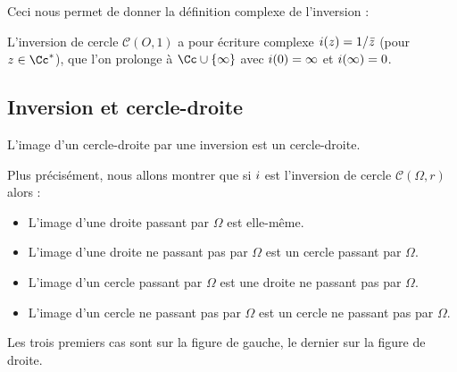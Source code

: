 \documentclass[11pt,class=report,crop=false]{standalone}
\begin{document}
Ceci nous permet de donner la définition complexe de l'inversion :

\begin{exemple}
L'inversion de cercle $\mathcal{C}(O,1)$ a pour écriture complexe $i(z)=1/ \bar z$ (pour $z\in \Cc^*$),
que l'on prolonge à $\Cc \cup \{\infty\}$ avec $i(0) = \infty$ et $i(\infty)=0$.
\end{exemple}


\subsection{Inversion et cercle-droite}

\begin{theoreme}
L'image d'un cercle-droite par une inversion est un cercle-droite. 
\end{theoreme}


Plus précisément, nous allons montrer que si $i$ est l'inversion
de cercle $\mathcal{C}(\Omega,r)$ alors :
\begin{itemize}
  \item L'image d'une droite passant par $\Omega$ est elle-même.
  
  \item L'image d'une droite ne passant pas par $\Omega$ est un cercle passant par $\Omega$.
  
  \item L'image d'un cercle passant par $\Omega$ est une droite ne passant pas par $\Omega$.
  
  \item L'image d'un cercle ne passant pas par $\Omega$ est un cercle ne passant pas par $\Omega$.
\end{itemize}

Les trois premiers cas sont sur la figure de gauche, le dernier sur la figure de droite. 
\end{document}
